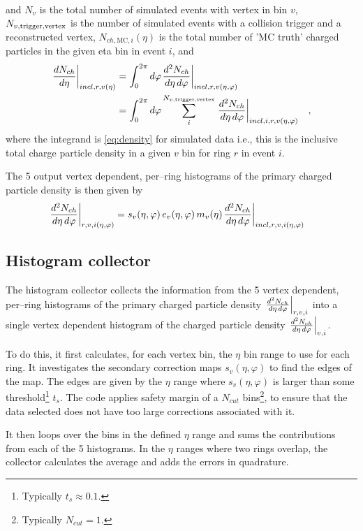 \documentclass[11pt]{article}
\newcommand{\dndetadphi}[1][]{{\ensuremath%
    \ifx|#1|\else\left.\fi%
    \frac{d^2N_{ch}}{d\eta\,d\varphi}%
    \ifx|#1|\else\right|_{#1}\fi%
}}
\newcommand{\Nsel}{{\ensuremath N_{v,\text{trigger,vertex}}}}
\begin{document}
\begin{description}
\begin{align}
  \end{align}
  and $N_v$ is the total number of simulated events with vertex in bin
  $v$, $\Nsel{}$ is the number of simulated events with a collision
  trigger and a reconstructed vertex, $N_{ch,\text{MC},i}(\eta)$ is
  the total number of 'MC truth' charged particles in the given eta
  bin in event $i$, and 
  \begin{align}
    \left.\frac{dN_{ch}}{d\eta}\right|_{incl,r,v(\eta)} &= 
    \int_0^{2\pi}d\varphi\dndetadphi[incl,r,v(\eta,\varphi)]
    \nonumber\\
    &=  \int_0^{2\pi}d\varphi\sum_i^{\Nsel{}}\dndetadphi[incl,i,r,v(\eta,\varphi)]\quad,
  \end{align}
  where the integrand is \eqref{eq:density} for simulated data i.e.,
  this is the inclusive total charge particle density in a given $v$
  bin for ring $r$ in event $i$. 
\end{description}

The 5 output vertex dependent, per--ring histograms of the primary
charged particle density is then given by
\begin{align}
  \dndetadphi[r,v,i(\eta,\varphi)] &=
  s_v(\eta,\varphi)\,e_v(\eta,\varphi)\,m_v(\eta)\dndetadphi[incl,r,v,i(\eta,\varphi)]
\end{align}

\subsection*{Histogram collector}

The histogram collector collects the information from the 5 vertex
dependent, per--ring histograms of the primary charged particle
density $\dndetadphi[r,v,i]$ into a single vertex dependent histogram
of the charged particle density $\dndetadphi[v,i]$.  

To do this, it first calculates, for each vertex bin, the $\eta$ bin
range to use for each ring.  It investigates the secondary correction
maps $s_v(\eta,\varphi)$ to find the edges of the map.  The edges are
given by the $\eta$ range where $s_v(\eta,\varphi)$ is larger than
some threshold\footnote{Typically $t_s\approx 0.1$.}  $t_s$. The code
applies safety margin of a $N_{cut}$ bins\footnote{Typically
  $N_{cut}=1$.}, to ensure that the data selected does not have too
large corrections associated with it.

It then loops over the bins in the defined $\eta$ range and sums the
contributions from each of the 5 histograms.  In the $\eta$ ranges
where two rings overlap, the collector calculates the average and adds
the errors in quadrature.
\end{document}
